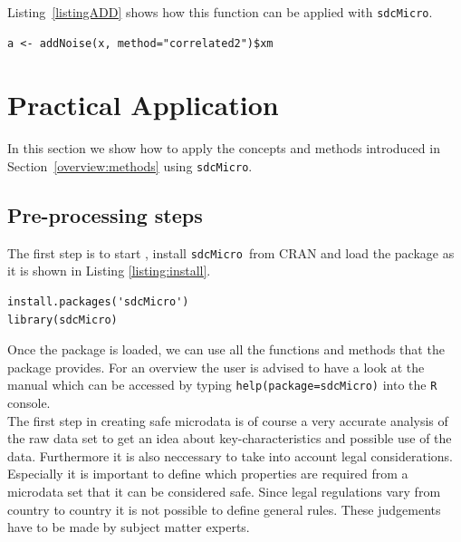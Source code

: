 \documentclass[12pt]{article}
\newcommand{\sdcMicro}{\texttt{sdcMicro}}
\begin{document}
Listing~\ref{listingADD} shows how this function can be applied with \sdcMicro .

\begin{lstlisting}[captionpos=b, caption={Example for adding correlated noise to continuous variables.}, label=listingADD]
a <- addNoise(x, method="correlated2")$xm
\end{lstlisting}



\section{Practical Application}\label{app}





In this section we show how to apply the concepts and methods 
introduced in Section~\ref{overview:methods} using \sdcMicro. 

\subsection{Pre-processing steps}

The first step is to start \R, install \sdcMicro~from CRAN and load the package as it is shown 
in Listing \ref{listing:install}.

\begin{lstlisting}[captionpos=b, caption={Installing and loading \sdcMicro.}, label=listing:install]
install.packages('sdcMicro')
library(sdcMicro)
\end{lstlisting}


Once the package is loaded, we can use all the functions and methods that the
package provides. For an overview the user is advised to have a look at the manual which 
can be accessed by typing \lstinline{help(package=sdcMicro)} into the \texttt{R} console. \\

The first step in creating safe microdata is of course a very accurate 
analysis of the raw data set to get an idea about key-characteristics and possible use of the data. 
Furthermore it is also neccessary to take into account legal considerations. 
Especially it is important to define which properties are required 
from a microdata set that it can be considered safe. Since legal regulations vary from 
country to country it is not possible to define general rules. These judgements have to 
be made by subject matter experts.\\
\end{document}
